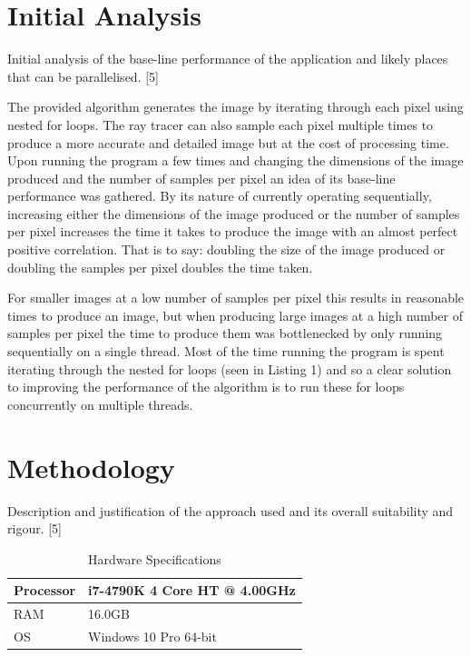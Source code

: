 \documentclass[journal,transmag]{IEEEtran}
\begin{document}
	\section{Initial Analysis}
	Initial analysis of the base-line performance of the application
	and likely places that can be parallelised. [5]
	
	The provided algorithm generates the image by iterating through each pixel using nested for loops. The ray tracer can also sample each pixel multiple times to produce a more accurate and detailed image but at the cost of processing time. Upon running the program a few times and changing the dimensions of the image produced and the number of samples per pixel an idea of its base-line performance was gathered.  By its nature of currently operating sequentially, increasing either the dimensions of the image produced or the number of samples per pixel increases the time it takes to produce the image with an almost perfect positive correlation. That is to say: doubling the size of the image produced or doubling the samples per pixel doubles the time taken.
	
	
	
	For smaller images at a low number of samples per pixel this results in reasonable times to produce an image, but when producing large images at a high number of samples per pixel the time to produce them was bottlenecked by only running sequentially on a single thread. Most of the time running the program is spent iterating through the nested for loops (seen in Listing 1) and so a clear solution to improving the performance of the algorithm is to run these for loops concurrently on multiple threads.
	
	
	\section{Methodology}
	Description and justification of the approach used and
	its overall suitability and rigour. [5]
	
	\begin{table}[!h]
		\renewcommand{\arraystretch}{1.3}
		\caption{Hardware Specifications}
		\label{hardware}
		\centering
		\begin{tabular}{|l|l|}
			\hline
			Processor & i7-4790K 4 Core HT @ 4.00GHz\\ \hline
			RAM & 16.0GB\\ \hline
			OS & Windows 10 Pro 64-bit\\ \hline
		\end{tabular}
	\end{table}
	
\end{document}
